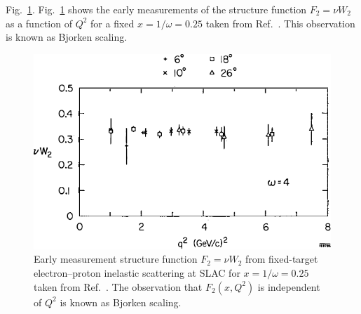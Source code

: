 Fig.\ \ref{fig:w2}. Fig.\ \ref{fig:w2} shows the early measurements of the 
structure function $F_2=\nu W_2$ as a function of $Q^2$ for a fixed 
$x=1/\omega=0.25$ taken from Ref.\ \cite{friedman1972}. This observation is 
known as Bjorken scaling\cite{bjorken1969}.
\begin{figure}[htpb!]
	\centering
	\includegraphics[width=0.5\linewidth]{images/nu_W2}
	\caption{Early measurement structure function $F_2=\nu W_2$ from 
	fixed-target electron–proton inelastic scattering at SLAC for 
	$x=1/\omega=0.25$ taken from Ref.\ \cite{friedman1972}. The observation 
	that $F_2(x,Q^2)$ is independent of $Q^2$ is known as Bjorken scaling. }
	\label{fig:w2}
\end{figure}

